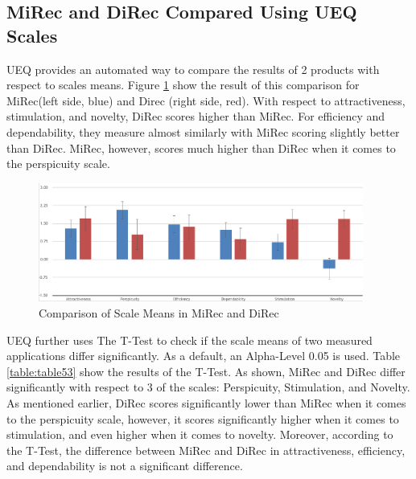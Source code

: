 \subsection{MiRec and DiRec Compared Using UEQ Scales}
UEQ provides an automated way to compare the results of 2 products with respect
to scales means. Figure \ref{fig:figure53} show the result of this comparison
for MiRec(left side, blue) and Direc (right side, red). With respect to
attractiveness, stimulation, and novelty, DiRec scores higher than MiRec. For
efficiency and dependability, they measure almost similarly with MiRec scoring
slightly better than DiRec. MiRec, however, scores much higher than DiRec when
it comes to the perspicuity scale.
\begin{figure}[!htbp]
\centering
\includegraphics[width=0.95\textwidth]{figures/compare}
\caption{Comparison of Scale Means in MiRec and DiRec}
\label{fig:figure53}
\end{figure}

UEQ further uses The T-Test to check if the scale means of two measured
applications differ significantly. As a default, an Alpha-Level 0.05 is used.
Table \ref{table:table53} show the results of the T-Test. As shown, MiRec and
DiRec differ significantly with respect to 3 of the scales: Perspicuity,
Stimulation, and Novelty. As mentioned earlier, DiRec scores significantly lower
than MiRec when it comes to the perspicuity scale, however, it scores
significantly higher when it comes to stimulation, and even higher when it
comes to novelty. Moreover, according to the T-Test, the difference between
MiRec and DiRec in attractiveness, efficiency, and dependability is not a
significant difference.


